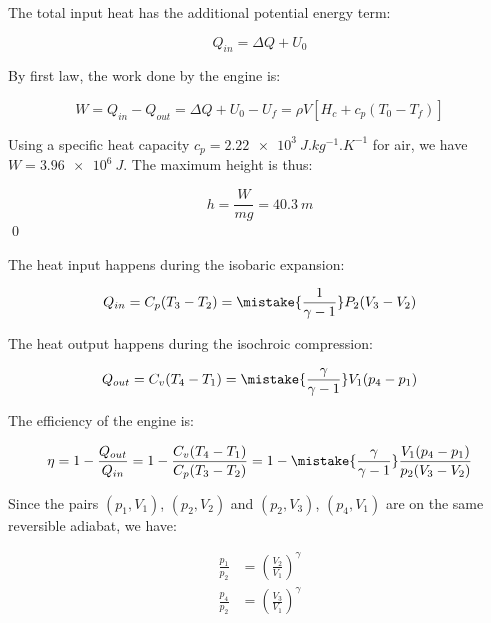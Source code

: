 \documentclass[12pt]{article}
\begin{document}
The total input heat has the additional potential energy term:

\begin{equation}
    Q_{in} = \Delta Q + U_{0}
\end{equation}

By first law, the work done by the engine is:

\begin{equation}
    W = Q_{in} - Q_{out} = \Delta Q + U_{0} - U_{f} = \rho V [H_{c} + c_{p} (T_{0} - T_{f})]
\end{equation}

Using a specific heat capacity $c_{p} = \qty{2.22e3}{J.kg^{-1}.K^{-1}}$ for air, we have $W = \qty{3.96e6}{J}$. The maximum height is thus:

\begin{equation}
    h = \frac{W}{m g} = \qty{40.3}{m}
\end{equation}
\qed


The heat input happens during the isobaric expansion:

\begin{equation}
    Q_{in} = C_{p} (T_{3} - T_{2}) = \mistake{\frac{1}{\gamma - 1}} P_{2} (V_{3} - V_{2})
\end{equation}

The heat output happens during the isochroic compression:

\begin{equation}
    Q_{out} = C_{v} (T_{4} - T_{1}) = \mistake{\frac{\gamma}{\gamma - 1}} V_{1} (p_{4} - p_{1})
\end{equation}

The efficiency of the engine is:

\begin{equation}
    \eta = 1 - \frac{Q_{out}}{Q_{in}} = 1 - \frac{C_{v} (T_{4} - T_{1})}{C_{p} (T_{3} - T_{2})} = 1 - \mistake{\frac{\gamma}{\gamma - 1}} \frac{V_{1} (p_{4} - p_{1})}{p_{2} (V_{3} - V_{2})}
\end{equation}

Since the pairs $(p_{1}, V_{1})$, $(p_{2}, V_{2})$ and $(p_{2}, V_{3})$, $(p_{4}, V_{1})$ are on the same reversible adiabat, we have:

\begin{equation}
    \begin{split}
        \frac{p_{1}}{p_{2}} &= \left( \frac{V_{2}}{V_{1}} \right)^{\gamma} \\
        \frac{p_{4}}{p_{2}} &= \left( \frac{V_{3}}{V_{1}} \right)^{\gamma}
    \end{split}
\end{equation}
\end{document}
